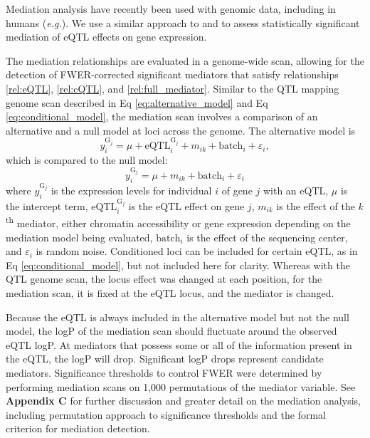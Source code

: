 \documentclass[9pt,twocolumn,twoside]{gsajnl}
\newcommand{\eg}{\emph{e.g.}}
\begin{document}
Mediation analysis have recently been used with genomic data, including in humans (\eg \citealt{Battle2014}). We use a similar approach to \cite{Chick2016} and \cite{Keller2018} to assess statistically significant mediation of eQTL effects on gene expression.

The mediation relationships are evaluated in a genome-wide  scan, allowing for the detection of FWER-corrected significant mediators that satisfy relationships \ref{rel:eQTL}, \ref{rel:cQTL}, and \ref{rel:full_mediator}. Similar to the QTL mapping genome scan described in Eq \ref{eq:alternative_model} and Eq \ref{eq:conditional_model}, the mediation scan involves a comparison of an alternative and a null model at loci across the genome. The alternative model is
\begin{equation}
y^{\text{G}_{j}}_{i} = \mu + \text{eQTL}_{i}^{\text{G}_{j}} + m_{ik} + \text{batch}_{i} + \varepsilon_{i},
\label{eq:mediation_alt}
\end{equation}
which is compared to the null model:
\begin{equation}
y^{\text{G}_{j}}_{i} = \mu + m_{ik} \nonumber + \text{batch}_{i} + \varepsilon_{i}
\label{eq:mediation_null}
\end{equation}
where $y^{\text{G}_{j}}_{i}$ is the expression levels for individual $i$ of gene $j$ with an eQTL, $\mu$ is the intercept term, $\text{eQTL}_{i}^{\text{G}_{j}}$ is the eQTL effect on gene $j$, $m_{ik}$ is the effect of the $k$\textsuperscript{th} mediator, either chromatin accessibility or gene expression depending on the mediation model being evaluated, $\text{batch}_{i}$ is the effect of the sequencing center, and $\varepsilon_{i}$ is random noise. Conditioned loci can be included for certain eQTL, as in Eq \ref{eq:conditional_model}, but not included here for clarity. Whereas with the QTL genome scan, the locus effect was changed at each position, for the mediation scan, it is fixed at the eQTL locus, and the mediator is changed.

Because the eQTL is always included in the alternative model but not the null model, the logP of the mediation scan should fluctuate around the observed eQTL logP. At mediators that possess some or all of the information present in the eQTL, the logP will drop. Significant logP drops represent candidate mediators. Significance thresholds to control FWER were determined by performing mediation scans on 1,000 permutations of the mediator variable. See \textbf{Appendix C} for further discussion and greater detail on the mediation analysis, including permutation approach to significance thresholds and the formal criterion for mediation detection.
\end{document}
